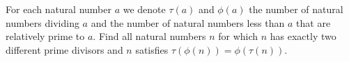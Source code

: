 For each natural number $a$ we denote $\tau (a)$ and $\phi (a)$ the number of natural numbers dividing $a$ and the number of natural numbers less than $a$ that are relatively prime to $a$. Find all natural numbers $n$ for which $n$ has exactly two different prime divisors and $n$ satisfies $\tau (\phi (n))=\phi (\tau (n))$.